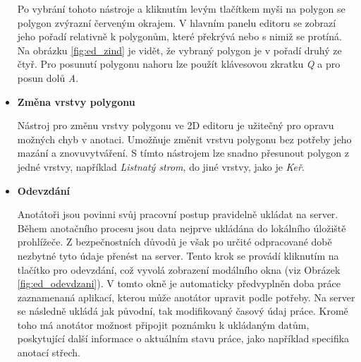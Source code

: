 \begin{itemize}
  Po vybrání tohoto nástroje a kliknutím levým tlačítkem myši na polygon se polygon zvýrazní červeným okrajem. V hlavním panelu editoru se zobrazí jeho pořadí relativně k polygonům, které překrývá nebo s nimiž se protíná. Na obrázku \vref{fig:ed_zind} je vidět, že  vybraný polygon je v pořadí druhý ze čtyř. Pro posunutí polygonu nahoru lze použít klávesovou zkratku \textit{Q} a pro posun dolů \textit{A}.


  \item \textbf{Změna vrstvy polygonu}
  
  Nástroj pro změnu vrstvy polygonu ve 2D editoru je užitečný pro opravu možných chyb v anotaci. Umožňuje změnit vrstvu polygonu bez potřeby jeho mazání a znovuvytváření. S tímto nástrojem lze snadno přesunout polygon z jedné vrstvy, například \textit{Listnatý strom}, do jiné vrstvy, jako je \textit{Keř}.

  \item \textbf{Odevzdání}
  
  Anotátoři jsou povinni svůj pracovní postup pravidelně ukládat na server. Během anotačního procesu jsou data nejprve ukládána do lokálního úložiště prohlížeče. Z bezpečnostních důvodů je však po určité odpracované době nezbytné tyto údaje přenést na server. Tento krok se provádí kliknutím na tlačítko pro odevzdání, což vyvolá zobrazení modálního okna (viz Obrázek \vref{fig:ed_odevdzani}). V tomto okně je automaticky předvyplněn doba práce zaznamenaná aplikací, kterou může anotátor upravit podle potřeby. Na server se následně ukládá jak původní, tak modifikovaný časový údaj práce. Kromě toho má anotátor možnost připojit poznámku k ukládaným datům, poskytující další informace o aktuálním stavu práce, jako například specifika anotací střech.


\end{itemize}